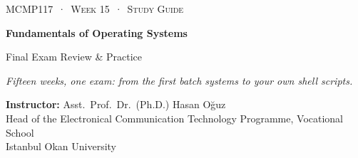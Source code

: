 \documentclass[11pt,a4paper]{article}
\begin{document}
\setlength{\emergencystretch}{3em}
\newcommand{\gantt}[2]{%
\begin{tikzpicture}[x=#1cm,y=1cm]
\foreach \p/\a/\b in {#2} {
  \fill[col\p] (\a,0) rectangle (\b,0.62);
  \draw[white,line width=1.2pt] (\a,0) -- (\a,0.62);
  \node[font=\small\bfseries,text=txt\p] at ({(\a+\b)/2},0.31) {\p};
  \draw[muted] (\a,0) -- (\a,-0.1) node[below,font=\scriptsize,text=muted,inner sep=1.5pt] {\a};
  \draw[muted] (\b,0) -- (\b,-0.1) node[below,font=\scriptsize,text=muted,inner sep=1.5pt] {\b};
}
\end{tikzpicture}}
\newcommand{\nw}[1]{\textbf{\color{mintdeep}#1}}
\newcommand{\F}{\textcolor{red!70!black}{\textbf{F}}}
\newcommand{\pts}[1]{\hfill\textcolor{mintdeep}{\textbf{[#1~pt]}}}

\thispagestyle{empty}
\begin{tcolorbox}[enhanced,colback=dark,colframe=dark,arc=0pt,boxrule=0pt,
  left=18pt,right=18pt,top=20pt,bottom=20pt,coltext=white]
{\small\color{mint}\textsc{MCMP117 \,·\, Week 15 \,·\, Study Guide}}\par\medskip
{\headfont\fontsize{26}{30}\selectfont\bfseries Fundamentals of Operating Systems}\par\medskip
{\large Final Exam Review \& Practice}\par\smallskip
{\small\itshape\color{white!70} Fifteen weeks, one exam: from the first batch systems to your own shell scripts.}
\end{tcolorbox}

\vspace{0.4em}
{\small
\textbf{Instructor:} Asst.\ Prof.\ Dr.\ (Ph.D.) Hasan Oğuz\\
Head of the Electronical Communication Technology Programme, Vocational School\\
Istanbul Okan University\par}
\end{document}
